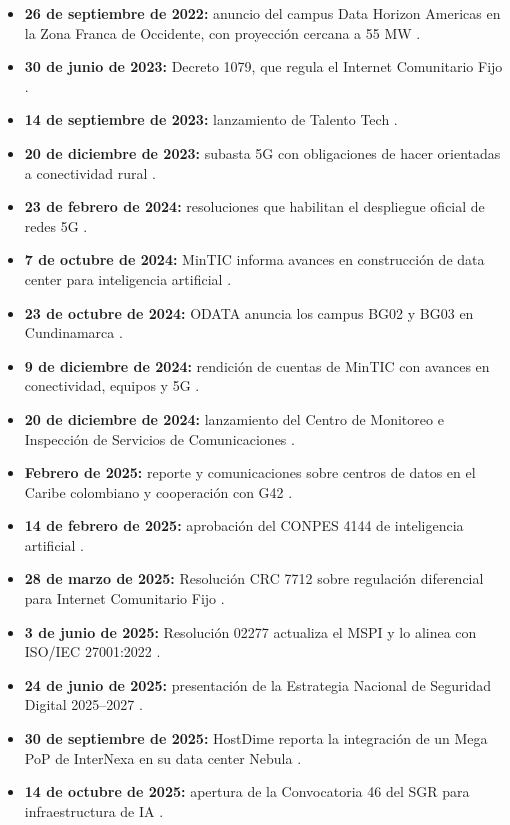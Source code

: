 \documentclass[9pt,letterpaper,twocolumn,twoside,apabib]{rho-class/rho}
\begin{document}
\begin{itemize}
    \item \textbf{26 de septiembre de 2022:} anuncio del campus Data Horizon Americas en la Zona Franca de Occidente, con proyección cercana a 55 MW \parencite{say_global_2026}.
    \item \textbf{30 de junio de 2023:} Decreto 1079, que regula el Internet Comunitario Fijo \parencite{funcionpublica_decreto_1079_2023}.
    \item \textbf{14 de septiembre de 2023:} lanzamiento de Talento Tech \parencite{mintic_talento_tech_lanzamiento_2023}.
    \item \textbf{20 de diciembre de 2023:} subasta 5G con obligaciones de hacer orientadas a conectividad rural \parencite{mintic_5g_realidad_2023}.
    \item \textbf{23 de febrero de 2024:} resoluciones que habilitan el despliegue oficial de redes 5G \parencite{mintic_despliegue_5g_2024}.
    \item \textbf{7 de octubre de 2024:} MinTIC informa avances en construcción de data center para inteligencia artificial \parencite{mintic_data_center_ia_2024}.
    \item \textbf{23 de octubre de 2024:} ODATA anuncia los campus BG02 y BG03 en Cundinamarca \parencite{dcd_odata_data_centers_2024}.
    \item \textbf{9 de diciembre de 2024:} rendición de cuentas de MinTIC con avances en conectividad, equipos y 5G \parencite{mintic_rendicion_cuentas_2024}.
    \item \textbf{20 de diciembre de 2024:} lanzamiento del Centro de Monitoreo e Inspección de Servicios de Comunicaciones \parencite{mintic_cmic_telecomunicaciones_2024}.
    \item \textbf{Febrero de 2025:} reporte y comunicaciones sobre centros de datos en el Caribe colombiano y cooperación con G42 \parencite{dcd_colombia_emiratos_datacenters_2025,minciencias_revolucion_cientifica_2025}.
    \item \textbf{14 de febrero de 2025:} aprobación del CONPES 4144 de inteligencia artificial \parencite{vanegas_conpes_4144_2025}.
    \item \textbf{28 de marzo de 2025:} Resolución CRC 7712 sobre regulación diferencial para Internet Comunitario Fijo \parencite{crc_resolucion_7712_2025}.
    \item \textbf{3 de junio de 2025:} Resolución 02277 actualiza el MSPI y lo alinea con ISO/IEC 27001:2022 \parencite{mintic_mspi_resolucion_02277_2025}.
    \item \textbf{24 de junio de 2025:} presentación de la Estrategia Nacional de Seguridad Digital 2025--2027 \parencite{mintic_seguridad_digital_2025}.
    \item \textbf{30 de septiembre de 2025:} HostDime reporta la integración de un Mega PoP de InterNexa en su data center Nebula \parencite{smith_internexa_hostdime_2025}.
    \item \textbf{14 de octubre de 2025:} apertura de la Convocatoria 46 del SGR para infraestructura de IA \parencite{minciencias_colombia_inteligente_2025}.
\end{itemize}
\end{document}
